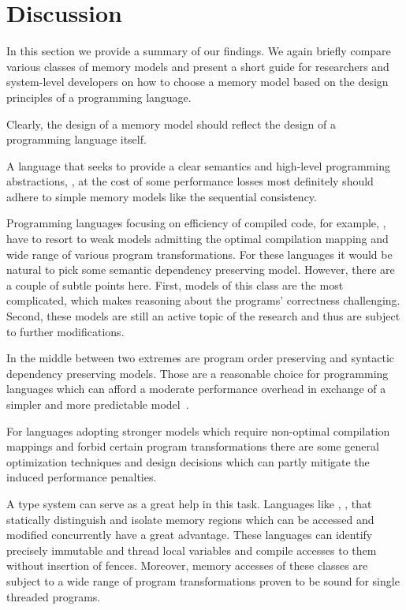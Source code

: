 \section{Discussion}
\label{sec:discussion}

In this section we provide a summary of our findings.
We again briefly compare various classes of memory models 
and present a short guide for researchers and system-level developers 
on how to choose a memory model based on 
the design principles of a programming language.   

Clearly, the design of a memory model 
should reflect the design of a programming language itself. 

A language that seeks to provide a clear semantics and 
high-level programming abstractions, \eg \Haskell, at the cost 
of some performance losses most definitely should 
adhere to simple memory models like the sequential consistency. 

Programming languages focusing on efficiency 
of compiled code, for example, \CPP, 
have to resort to weak models admitting 
the optimal compilation mapping 
and wide range of various program transformations. 
For these languages it would be natural 
to pick some semantic dependency preserving model. 
However, there are a couple of subtle points here. 
First, models of this class are the most complicated, 
which makes reasoning about the programs' correctness challenging. 
Second, these models are still an active topic 
of the research and thus are subject to further modifications.

In the middle between two extremes are program order preserving and 
syntactic dependency preserving models.
Those are a reasonable choice for programming languages
which can afford a moderate performance overhead 
in exchange of a simpler and more predictable model~\cite{Ou-Demsky:OOPSLA18}.

For languages adopting stronger models which require non-optimal
compilation mappings and forbid certain program transformations
there are some general optimization techniques and design decisions
which can partly mitigate the induced performance penalties.

A type system can serve as a great help in this task. 
Languages like \Haskell, \OCaml, \Rust that 
statically distinguish and isolate memory regions 
which can be accessed and modified concurrently have a great advantage.
These languages can identify precisely 
immutable and thread local variables
and compile accesses to them without insertion of fences.
Moreover, memory accesses of these classes are subject to 
a wide range of program transformations proven to be
sound for single threaded programs. 
 

